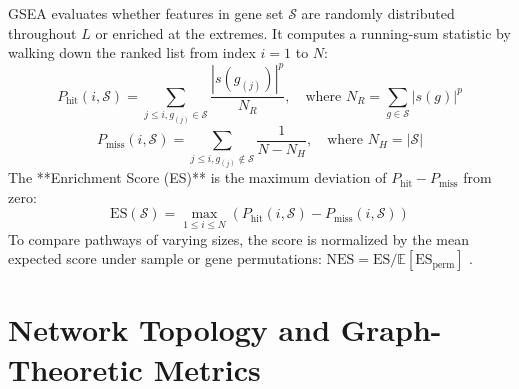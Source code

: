 \documentclass[11pt,oneside]{book}
\begin{document}
GSEA evaluates whether features in gene set $\mathcal{S}$ are randomly distributed throughout $L$ or enriched at the extremes. It computes a running-sum statistic by walking down the ranked list from index $i = 1$ to $N$:
\begin{equation}
\label{eq:gsea_running_sum}
P_{\text{hit}}(i, \mathcal{S}) = \sum_{j \le i, g_{(j)} \in \mathcal{S}} \frac{|s(g_{(j)})|^p}{N_R}, \quad \text{where } N_R = \sum_{g \in \mathcal{S}} |s(g)|^p
\end{equation}
\begin{equation}
P_{\text{miss}}(i, \mathcal{S}) = \sum_{j \le i, g_{(j)} \notin \mathcal{S}} \frac{1}{N - N_H}, \quad \text{where } N_H = |\mathcal{S}|
\end{equation}
The **Enrichment Score (ES)** is the maximum deviation of $P_{\text{hit}} - P_{\text{miss}}$ from zero:
\begin{equation}
\text{ES}(\mathcal{S}) = \max_{1 \le i \le N} \left( P_{\text{hit}}(i, \mathcal{S}) - P_{\text{miss}}(i, \mathcal{S}) \right)
\end{equation}
To compare pathways of varying sizes, the score is normalized by the mean expected score under sample or gene permutations: $\text{NES} = \text{ES} / \mathbb{E}[\text{ES}_{\text{perm}}]$ \cite{subramanian2005gene, korotkevich2021fast}.

\section{Network Topology and Graph-Theoretic Metrics}
\end{document}
